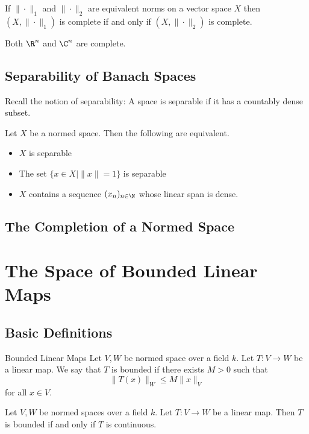 \documentclass[a4paper]{article}
\begin{document}
\begin{lmm}{}{} If $\|\cdot\|_1$ and $\|\cdot\|_2$ are equivalent norms on a vector space $X$ then $(X,\|\cdot\|_1)$ is complete if and only if $(X,\|\cdot\|_2)$ is complete. 
\end{lmm}

\begin{prp}{}{} Both $\R^n$ and $\C^n$ are complete. 
\end{prp}

\subsection{Separability of Banach Spaces}
Recall the notion of separability: A space is separable if it has a countably dense subset. 

\begin{lmm}{}{} Let $X$ be a normed space. Then the following are equivalent. 
\begin{itemize}
\item $X$ is separable
\item The set $\{x\in X|\|x\|=1\}$ is separable
\item $X$ contains a sequence $(x_n)_{n\in\N}$ whose linear span is dense. 
\end{itemize}
\end{lmm}

\subsection{The Completion of a Normed Space}

\pagebreak
\section{The Space of Bounded Linear Maps}
\subsection{Basic Definitions}
\begin{defn}{Bounded Linear Maps}{} Let $V,W$ be normed space over a field $k$. Let $T:V\to W$ be a linear map. We say that $T$ is bounded if there exists $M>0$ such that $$\|T(x)\|_W\leq M\|x\|_V$$ for all $x\in V$. 
\end{defn}

\begin{lmm}{}{} Let $V,W$ be normed spaces over a field $k$. Let $T:V\to W$ be a linear map. Then $T$ is bounded if and only if $T$ is continuous. 
\end{lmm}
\end{document}
